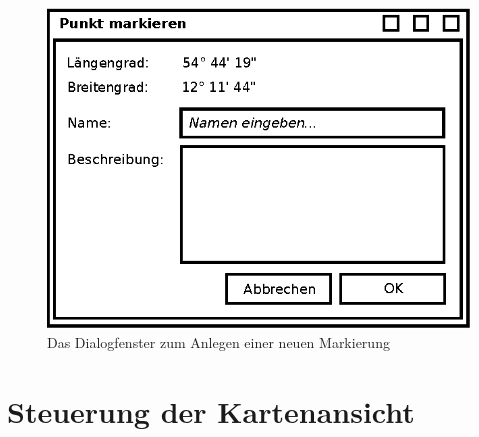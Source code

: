 \documentclass[10pt]{scrreprt}
\begin{document}
\begin{figure}
	\centering
	\includegraphics[scale=0.9]{GUI-Markieren.eps}
	\caption{Das Dialogfenster zum Anlegen einer neuen Markierung}
\end{figure}

\clearpage
\pagebreak

\section{Steuerung der Kartenansicht}

\vspace{3mm}
\end{document}
